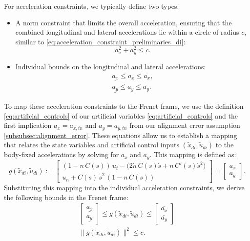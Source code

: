 For acceleration constraints, we typically define two types:
\begin{itemize}
	\item A norm constraint that limits the overall acceleration, ensuring that the combined longitudinal and lateral accelerations lie within a circle of radius \(c\), similar to \eqref{eq:acceleration_constraint_preliminaries_di}:
	      \begin{equation}
		      a_x^2 + a_y^2 \leq c.
	      \end{equation}
	\item Individual bounds on the longitudinal and lateral accelerations:
	      \begin{align}
		      \underline{a_x} \leq a_x \leq \overline{a_x}, \\
		      \underline{a_y} \leq a_y \leq \overline{a_y}.
	      \end{align}
\end{itemize}

To map these acceleration constraints to the Frenet frame, we use the definition \eqref{eq:artificial_controls} of our artificial variables
\eqref{eq:artificial_controls} and the first implication $a_x=a_{x,tn}$ and $a_y=a_{y,tn}$ from our alignment error assumption
\ref{subsubsec:alignment_error}.
These equations allow us to establish a mapping that relates the state variables and artificial control inputs \((\tilde{x}_{di}, \tilde{u}_{di})\)
to the body-fixed accelerations by solving for $a_x$ and $a_y$.
This mapping is defined as:
\begin{equation}
	\label{def:g}
	g(\tilde{x}_{di}, \tilde{u}_{di}) :=
	\begin{bmatrix}
		(1 - n\,C(s))\,u_t - \bigl(2\dot{n}\,C(s)\dot{s} + n\,C'(s)\dot{s}^2\bigr) \\
		u_n + C(s)\,\dot{s}^2\,(1 - n\,C(s))
	\end{bmatrix}
	=
	\begin{bmatrix}
		a_x \\
		a_y
	\end{bmatrix}.
\end{equation}
Substituting this mapping into the individual acceleration constraints, we derive the following bounds in the Frenet frame:
\begin{align}
	\begin{bmatrix}
		\underline{a_x} \\[2mm] \underline{a_y}
	\end{bmatrix} \leq g(\tilde{x}_{di}, \tilde{u}_{di}) \leq \begin{bmatrix}
		                                                          \overline{a_x} \\[2mm] \overline{a_y}
	                                                          \end{bmatrix} \\[2mm]
	\|g(\tilde{x}_{di}, \tilde{u}_{di})\|^2 \leq c.
\end{align}

